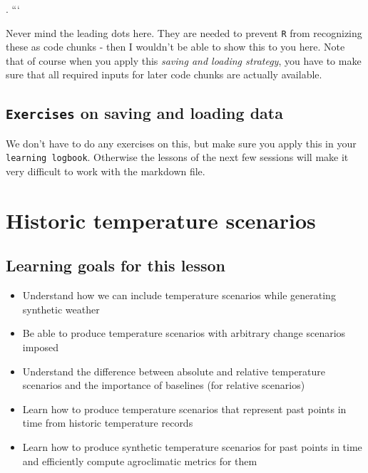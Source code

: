 \documentclass[
]{book}
\providecommand{\tightlist}{%
  \setlength{\itemsep}{0pt}\setlength{\parskip}{0pt}}
\begin{document}
. ```

Never mind the leading dots here. They are needed to prevent \texttt{R} from recognizing these as code chunks - then I wouldn't be able to show this to you here. Note that of course when you apply this \emph{saving and loading strategy}, you have to make sure that all required inputs for later code chunks are actually available.

\hypertarget{exercises_saveLoad}{%
\section*{\texorpdfstring{\texttt{Exercises} on saving and loading data}{Exercises on saving and loading data}}\label{exercises_saveLoad}}

We don't have to do any exercises on this, but make sure you apply this in your \texttt{learning\ logbook}. Otherwise the lessons of the next few sessions will make it very difficult to work with the markdown file.

\hypertarget{historic-temperature-scenarios}{%
\chapter{Historic temperature scenarios}\label{historic-temperature-scenarios}}

\hypertarget{goals_hist_temp_scen}{%
\section*{Learning goals for this lesson}\label{goals_hist_temp_scen}}

\begin{itemize}
\tightlist
\item
  Understand how we can include temperature scenarios while generating synthetic weather
\item
  Be able to produce temperature scenarios with arbitrary change scenarios imposed
\item
  Understand the difference between absolute and relative temperature scenarios and the importance of baselines (for relative scenarios)
\item
  Learn how to produce temperature scenarios that represent past points in time from historic temperature records
\item
  Learn how to produce synthetic temperature scenarios for past points in time and efficiently compute agroclimatic metrics for them
\end{itemize}
\end{document}
